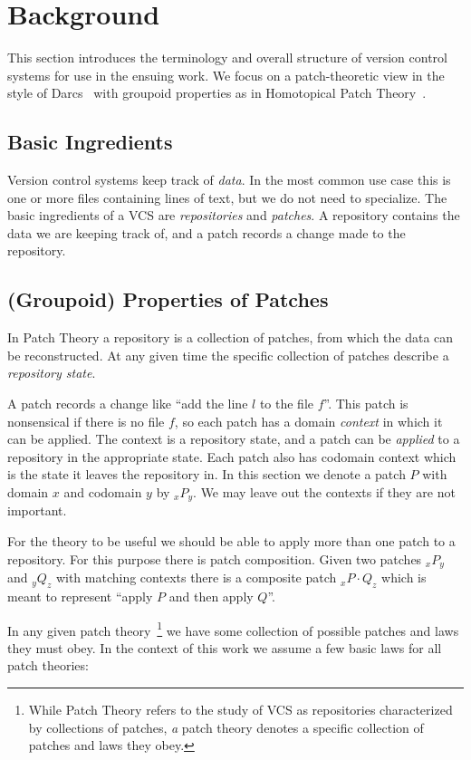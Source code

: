 \section{Background}

This section introduces the terminology and overall structure of version control
systems for use in the ensuing work. We focus on a patch-theoretic view in the
style of Darcs~\cite{Darcs, Lynagh2006, Sittampalam2005,
  jacobson2009formalization} with groupoid properties as in Homotopical Patch
Theory~\cite{Angiuli2016}.

\subsection{Basic Ingredients}
Version control systems keep track of \emph{data}. In the most common use case this is
one or more files containing lines of text, but we do not need to specialize.
The basic ingredients of a VCS are \emph{repositories} and \emph{patches}. A
repository contains the data we are keeping track of, and a patch records a
change made to the repository.

\subsection{(Groupoid) Properties of Patches}
In Patch Theory a repository is a collection of patches, from which the
data can be reconstructed. At any given time the specific collection of patches
describe a \emph{repository state}.

A patch records a change like ``add the line $l$ to the file $f$''. This
patch is nonsensical if there is no file $f$, so each patch has a domain
\emph{context} in which it can be applied. The context is a repository state,
and a patch can be \emph{applied} to a repository in the appropriate state.
Each patch also has codomain context which is the state it leaves the repository
in. In this section we denote a patch $P$ with domain $x$ and codomain $y$ by
$_xP_y$. We may leave out the contexts if they are not important.

For the theory to be useful we should be able to apply more than one patch to a
repository. For this purpose there is patch composition. Given two patches
$_xP_y$ and $_yQ_z$ with matching contexts there is a composite patch $_xP \cdot
Q_z$ which is meant to represent ``apply $P$ and then apply $Q$''.

In any given patch theory~\footnote{While Patch Theory refers to the study of
VCS as repositories characterized by collections of patches, \emph{a} patch
theory denotes a specific collection of patches and laws they obey.} we have
some collection of possible patches and laws they must obey. In the context of
this work we assume a few basic laws for all patch theories:

